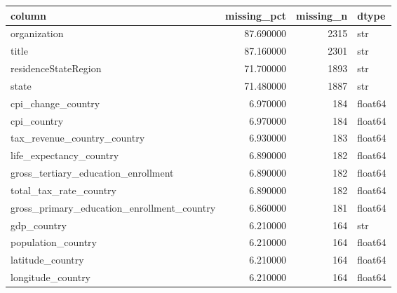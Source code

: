 \begin{tabular}{lrrl}
\toprule
column & missing\_pct & missing\_n & dtype \\
\midrule
organization & 87.690000 & 2315 & str \\
title & 87.160000 & 2301 & str \\
residenceStateRegion & 71.700000 & 1893 & str \\
state & 71.480000 & 1887 & str \\
cpi\_change\_country & 6.970000 & 184 & float64 \\
cpi\_country & 6.970000 & 184 & float64 \\
tax\_revenue\_country\_country & 6.930000 & 183 & float64 \\
life\_expectancy\_country & 6.890000 & 182 & float64 \\
gross\_tertiary\_education\_enrollment & 6.890000 & 182 & float64 \\
total\_tax\_rate\_country & 6.890000 & 182 & float64 \\
gross\_primary\_education\_enrollment\_country & 6.860000 & 181 & float64 \\
gdp\_country & 6.210000 & 164 & str \\
population\_country & 6.210000 & 164 & float64 \\
latitude\_country & 6.210000 & 164 & float64 \\
longitude\_country & 6.210000 & 164 & float64 \\
\bottomrule
\end{tabular}
